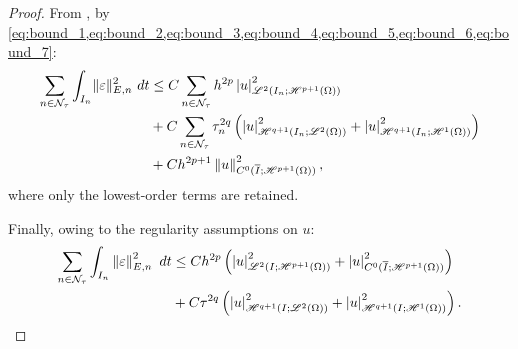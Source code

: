 \begin{proof}
    From , by \cref{eq:bound_1,eq:bound_2,eq:bound_3,eq:bound_4,eq:bound_5,eq:bound_6,eq:bound_7}:
    \begin{align*}
        \sum_{n \in \mathcal{N}_{\tau}} \int_{I_n} \lVert \varepsilon \rVert_{E, n}^2 ~ dt &\leq C \sum_{n \in \mathcal{N}_{\tau}} h^{2p} \left\lvert u \right\rvert_{\mathscr{L}^{2}(I_n; \mathscr{H}^{p + 1}(\Omega))}^2 \\
        &+ C \sum_{n \in \mathcal{N}_{\tau}} \tau_n^{2 q} \left( \left\lvert u \right\rvert_{\mathscr{H}^{q + 1}(I_n; \mathscr{L}^{2}(\Omega))}^2 + \left\lvert u \right\rvert_{\mathscr{H}^{q + 1}(I_n; \mathscr{H}^{1}(\Omega))}^2 \right) \\
        &+ C h^{2p + 1} \left\lVert u \right\rVert_{C^0(\overline{I}; \mathscr{H}^{p + 1}(\Omega))}^2,
    \end{align*}
    where only the lowest-order terms are retained.

    Finally, owing to the regularity assumptions on $u$:
    \begin{align*}
        \sum_{n \in \mathcal{N}_{\tau}} \int_{I_n}  \left\lVert \varepsilon \right\rVert_{E, n}^2  ~ d t &\leq C h^{2p} \left( \left\lvert u \right\rvert_{\mathscr{L}^{2}(I; \mathscr{H}^{p + 1}(\Omega))}^2 + \left\lvert u \right\rvert_{C^0(\overline{I}; \mathscr{H}^{p + 1}(\Omega))}^2 \right) \\
        &+ C \tau^{2q} \left( \left\lvert u \right\rvert_{\mathscr{H}^{q + 1}(I; \mathscr{L}^{2}(\Omega))}^2 + \left\lvert u \right\rvert_{\mathscr{H}^{q + 1}(I; \mathscr{H}^{1}(\Omega))}^2 \right).
    \end{align*}
\end{proof}